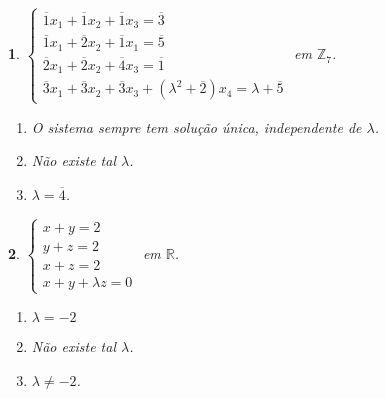 \documentclass[12pt]{exam}
\newtheorem{exercicio}{}
\newcommand{\integer}{\mathbb{Z}}
\newcommand{\real}{\mathbb{R}}
\begin{document}
\begin{exercicio}
$\begin{cases}
  \overline{1}x_1 + \overline{1}x_2 + \overline{1}x_3 = \overline{3}\\
  \overline{1}x_1 + \overline{2}x_2 + \overline{1}x_1 = \overline{5}\\
  \overline{2}x_1 + \overline{2}x_2 + \overline{4}x_3 = \overline{1}\\
  \overline{3}x_1 + \overline{3}x_2 + \overline{3}x_3 + (\lambda^2 + \overline{2})x_4 = \lambda + \overline{5}
\end{cases}$ em $\integer_7$.
\begin{solucao}
  \begin{enumerate}[label={\alph*})]
    \item O sistema sempre tem solu\c{c}\~ao \'unica, independente de $\lambda$.
    \item N\~ao existe tal $\lambda$.
    \item $\lambda = \overline{4}$.
  \end{enumerate}
\end{solucao}
\end{exercicio}

\begin{exercicio}\label{sistemasfim}
$\begin{cases}
  x + y = 2\\
  y + z = 2\\
  x + z = 2\\
  x + y + \lambda z = 0
\end{cases}$ em $\real$.
\begin{solucao}
  \begin{enumerate}[label={\alph*})]
    \item $\lambda = -2$
    \item N\~ao existe tal $\lambda$.
    \item $\lambda \ne -2$.
  \end{enumerate}
\end{solucao}
\end{exercicio}
\end{document}
